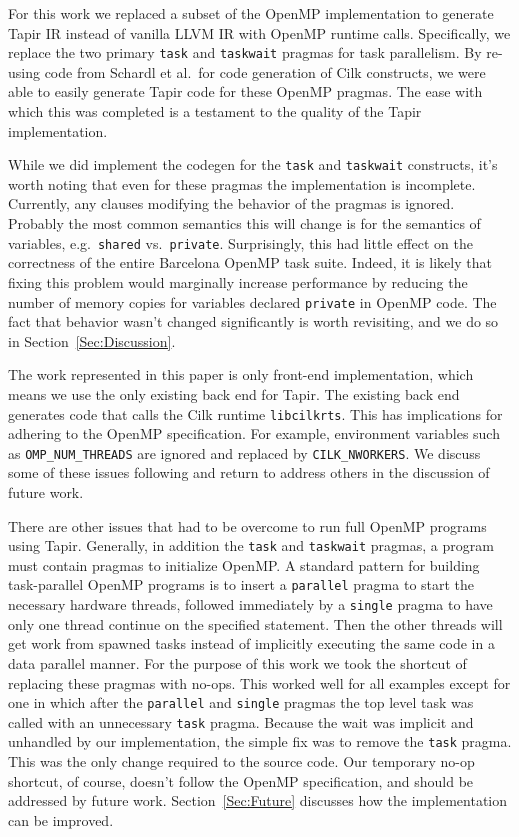 \documentclass[sigconf]{acmart}
\begin{document}
For this work we replaced a subset of the OpenMP implementation to generate
Tapir IR instead of vanilla LLVM IR with OpenMP runtime calls. Specifically, we
replace the two primary \texttt{task} and \texttt{taskwait} pragmas for task
parallelism. By re-using code from Schardl et al.\ for code generation of Cilk
constructs, we were able to easily generate Tapir code for these OpenMP
pragmas. The ease with which this was completed is a testament to the quality
of the Tapir implementation.

While we did implement the codegen for the \texttt{task} and
\texttt{taskwait} constructs, it's worth noting that even for these pragmas
the implementation is incomplete. Currently, any clauses modifying the behavior
of the pragmas is ignored. Probably the most common semantics this will change
is for the semantics of variables, e.g.\ \texttt{shared} vs.\ \texttt{private}.
Surprisingly, this had little effect on the correctness of the entire Barcelona
OpenMP task suite. Indeed, it is likely that fixing this problem would
marginally increase performance by reducing the number of memory copies for
variables declared \texttt{private} in OpenMP code.  The fact that behavior
wasn't changed significantly is worth revisiting, and we do so in
Section~\ref{Sec:Discussion}.

The work represented in this paper is only front-end implementation, which
means we use the only existing back end for Tapir. The existing back end
generates code that calls the Cilk runtime \texttt{libcilkrts}. This has
implications for adhering to the OpenMP specification. For example, environment
variables such as \texttt{OMP\_NUM\_THREADS} are ignored and replaced by
\texttt{CILK\_NWORKERS}.  We discuss some of these issues following and return to
address others in the discussion of future work.

There are other issues that had to be overcome to run full OpenMP programs
using Tapir. Generally, in addition the \texttt{task} and \texttt{taskwait}
pragmas, a program must contain pragmas to initialize OpenMP.  A standard
pattern for building task-parallel OpenMP programs is to insert a
\texttt{parallel} pragma to start the necessary hardware threads, followed
immediately by a \texttt{single} pragma to have only one thread continue on the
specified statement. Then the other threads will get work from spawned tasks
instead of implicitly executing the same code in a data parallel manner. For
the purpose of this work we took the shortcut of replacing these pragmas with
no-ops. This worked well for all examples except for one in which after the
\texttt{parallel} and \texttt{single} pragmas the top level task was called
with an unnecessary \texttt{task} pragma.  Because the wait was implicit and
unhandled by our implementation, the simple fix was to remove the \texttt{task}
pragma. This was the only change required to the source code. Our temporary
no-op shortcut, of course, doesn't follow the OpenMP specification, and should
be addressed by future work. Section~\ref{Sec:Future} discusses how the
implementation can be improved.
\end{document}
